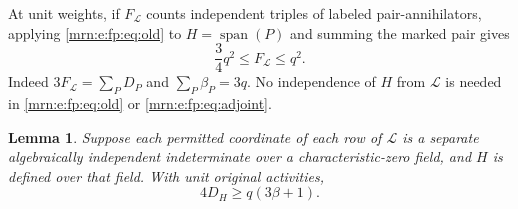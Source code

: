 \documentclass[11pt,a4paper]{article}
\newtheorem{lemma}[theorem]{Lemma}
\theoremstyle{remark}\newtheorem{remark}[theorem]{Remark}
\newcommand{\spn}{\operatorname{span}}     %
\begin{document}
At unit weights, if $F_{\mathcal L}$ counts independent triples of labeled pair-annihilators, applying \eqref{mrn:e:fp:eq:old} to $H=\spn(P)$ and summing the marked pair gives
\begin{equation}\label{mrn:e:fp:eq:adjoint}
 \frac34q^2\le F_{\mathcal L}\le q^2.
\end{equation}
Indeed $3F_{\mathcal L}=\sum_P D_P$ and $\sum_P\beta_P=3q$. No independence of $H$ from $\mathcal L$ is needed in \eqref{mrn:e:fp:eq:old} or \eqref{mrn:e:fp:eq:adjoint}.

\begin{lemma}\label{mrn:e:fp:lem:additive}
Suppose each permitted coordinate of each row of $\mathcal L$ is a separate algebraically independent indeterminate over a characteristic-zero field, and $H$ is defined over that field. With unit original activities,
\begin{equation}\label{mrn:e:fp:eq:additive}
 4D_H\ge q(3\beta+1).
\end{equation}
\end{lemma}
\end{document}
